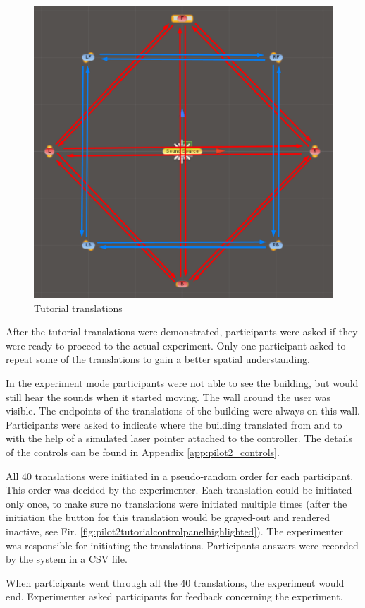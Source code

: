 \begin{figure}
	\centering
	\includegraphics[width=0.7\linewidth]{pilot2_endpoints_tutorial_tranlstaions}
	\caption{Tutorial translations}
	\label{fig:pilot2endpointstutorialtranlstaions}
\end{figure}



After the tutorial translations were demonstrated, participants were asked if they were ready to proceed to the actual experiment. Only one participant asked to repeat some of the translations to gain a better spatial understanding.

In the experiment mode participants were not able to see the building, but would still hear the sounds when it started moving. The wall around the user was visible. The endpoints of the translations of the building were always on this wall. Participants were asked to indicate where the building translated from and to with the help of a simulated laser pointer attached to the controller. The details of the controls can be found in Appendix \ref{app:pilot2_controls}.

All 40 translations were initiated in a pseudo-random order for each participant. This order was decided by the experimenter. Each translation could be initiated only once, to make sure no translations were initiated multiple times (after the initiation the button for this translation would be grayed-out and rendered inactive, see Fir. \ref{fig:pilot2tutorialcontrolpanelhighlighted}). The experimenter was responsible for  initiating the translations.
Participants answers were recorded by the system in a CSV file.

When participants went through all the 40 translations, the experiment would end. Experimenter asked participants for feedback concerning the experiment.

